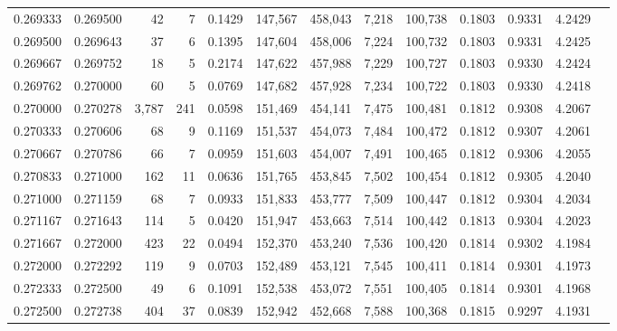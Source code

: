 \begin{tabular}{rrrrrrrrrrrrr}
0.269333 & 0.269500 &    42 &   7 &                                     0.1429 & 147,567 & 458,043 &   7,218 & 100,738 & 0.1803 & 0.9331 & 4.2429 \\
0.269500 & 0.269643 &    37 &   6 &                                     0.1395 & 147,604 & 458,006 &   7,224 & 100,732 & 0.1803 & 0.9331 & 4.2425 \\
0.269667 & 0.269752 &    18 &   5 &                                     0.2174 & 147,622 & 457,988 &   7,229 & 100,727 & 0.1803 & 0.9330 & 4.2424 \\
0.269762 & 0.270000 &    60 &   5 &                                     0.0769 & 147,682 & 457,928 &   7,234 & 100,722 & 0.1803 & 0.9330 & 4.2418 \\
0.270000 & 0.270278 & 3,787 & 241 &                                     0.0598 & 151,469 & 454,141 &   7,475 & 100,481 & 0.1812 & 0.9308 & 4.2067 \\
0.270333 & 0.270606 &    68 &   9 &                                     0.1169 & 151,537 & 454,073 &   7,484 & 100,472 & 0.1812 & 0.9307 & 4.2061 \\
0.270667 & 0.270786 &    66 &   7 &                                     0.0959 & 151,603 & 454,007 &   7,491 & 100,465 & 0.1812 & 0.9306 & 4.2055 \\
0.270833 & 0.271000 &   162 &  11 &                                     0.0636 & 151,765 & 453,845 &   7,502 & 100,454 & 0.1812 & 0.9305 & 4.2040 \\
0.271000 & 0.271159 &    68 &   7 &                                     0.0933 & 151,833 & 453,777 &   7,509 & 100,447 & 0.1812 & 0.9304 & 4.2034 \\
0.271167 & 0.271643 &   114 &   5 &                                     0.0420 & 151,947 & 453,663 &   7,514 & 100,442 & 0.1813 & 0.9304 & 4.2023 \\
0.271667 & 0.272000 &   423 &  22 &                                     0.0494 & 152,370 & 453,240 &   7,536 & 100,420 & 0.1814 & 0.9302 & 4.1984 \\
0.272000 & 0.272292 &   119 &   9 &                                     0.0703 & 152,489 & 453,121 &   7,545 & 100,411 & 0.1814 & 0.9301 & 4.1973 \\
0.272333 & 0.272500 &    49 &   6 &                                     0.1091 & 152,538 & 453,072 &   7,551 & 100,405 & 0.1814 & 0.9301 & 4.1968 \\
0.272500 & 0.272738 &   404 &  37 &                                     0.0839 & 152,942 & 452,668 &   7,588 & 100,368 & 0.1815 & 0.9297 & 4.1931 \\

\end{tabular}
